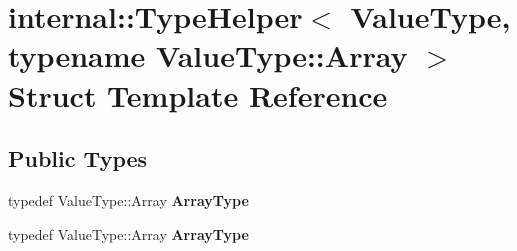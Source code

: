 \hypertarget{structinternal_1_1_type_helper_3_01_value_type_00_01typename_01_value_type_1_1_array_01_4}{}\section{internal\+:\+:Type\+Helper$<$ Value\+Type, typename Value\+Type\+:\+:Array $>$ Struct Template Reference}
\label{structinternal_1_1_type_helper_3_01_value_type_00_01typename_01_value_type_1_1_array_01_4}
\subsection*{Public Types}
\begin{DoxyCompactItemize}
\item 
typedef Value\+Type\+::\+Array {\bfseries Array\+Type}\hypertarget{structinternal_1_1_type_helper_3_01_value_type_00_01typename_01_value_type_1_1_array_01_4_a8f384dc96b6104e85b956ec5f7386434}{}\label{structinternal_1_1_type_helper_3_01_value_type_00_01typename_01_value_type_1_1_array_01_4_a8f384dc96b6104e85b956ec5f7386434}

\item 
typedef Value\+Type\+::\+Array {\bfseries Array\+Type}\hypertarget{structinternal_1_1_type_helper_3_01_value_type_00_01typename_01_value_type_1_1_array_01_4_a8f384dc96b6104e85b956ec5f7386434}{}\label{structinternal_1_1_type_helper_3_01_value_type_00_01typename_01_value_type_1_1_array_01_4_a8f384dc96b6104e85b956ec5f7386434}

\end{DoxyCompactItemize}
